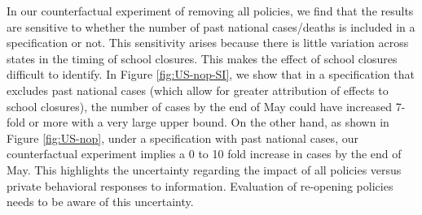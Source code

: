 \documentclass[11pt,reqno,letter]{amsart}
\theoremstyle{definition}
\begin{document}
In our counterfactual experiment of removing all policies, we find that the results are sensitive to whether  the number of past national cases/deaths is included  in a specification or not. This sensitivity arises because there is little variation across states in the timing of school closures.  This makes the effect of school closures difficult to identify. In Figure \ref{fig:US-nop-SI}, we show that in a specification that excludes past national cases (which allow for greater attribution of effects to school closures), the number of cases by the end of May could have increased 7-fold or more with a very large upper bound. On the other hand, as shown in Figure \ref{fig:US-nop}, under a specification with past national cases, our counterfactual experiment implies a 0 to 10 fold increase in cases by the end of May.  This highlights the uncertainty regarding the impact of all policies versus private behavioral responses to information. Evaluation of re-opening policies needs to be aware of this uncertainty.



%

\end{document}

